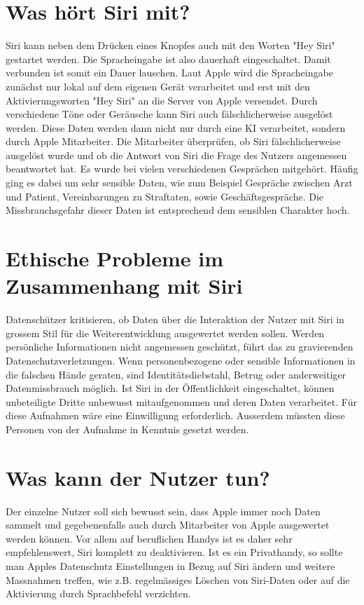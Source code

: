 \documentclass{article}
\begin{document}
\section{Was hört Siri mit?}
Siri kann neben dem Drücken eines Knopfes auch mit den Worten "Hey Siri" gestartet werden. Die Spracheingabe ist also dauerhaft eingeschaltet. Damit verbunden ist somit ein Dauer lauschen. Laut Apple wird die Spracheingabe zunächst nur lokal auf dem eigenen Gerät verarbeitet und erst mit den Aktivierungsworten "Hey Siri" an die Server von Apple versendet. Durch verschiedene Töne oder Geräusche kann Siri auch fälschlicherweise ausgelöst werden. Diese Daten werden dann nicht nur durch eine KI verarbeitet, sondern durch Apple Mitarbeiter. Die Mitarbeiter überprüfen, ob Siri fälschlicherweise ausgelöst wurde und ob die Antwort von Siri die Frage des Nutzers angemessen beantwortet hat.
Es wurde bei vielen verschiedenen Gesprächen mitgehört. Häufig ging es dabei um sehr sensible Daten, wie zum Beispiel Gespräche zwischen Arzt und Patient, Vereinbarungen zu Straftaten, sowie Geschäftsgespräche. Die Missbrauchsgefahr dieser Daten ist entsprechend dem sensiblen Charakter hoch. 


\section{Ethische Probleme im Zusammenhang mit Siri}
Datenschützer kritisieren, ob Daten über die Interaktion der Nutzer mit Siri in grossem Stil für die Weiterentwicklung ausgewertet werden sollen. Werden persönliche Informationen nicht angemessen geschützt, führt das zu gravierenden Datenschutzverletzungen. Wenn personenbezogene oder sensible Informationen in die falschen Hände geraten, sind Identitätsdiebstahl, Betrug oder anderweitiger Datenmissbrauch möglich. Ist Siri in der Öffentlichkeit eingeschaltet, können unbeteiligte Dritte unbewusst mitaufgenommen und deren Daten verarbeitet.
Für diese Aufnahmen wäre eine Einwilligung erforderlich. Ausserdem müssten diese Personen von der Aufnahme in Kenntnis gesetzt werden.

\section{Was kann der Nutzer tun?}
Der einzelne Nutzer soll sich bewusst sein, dass Apple immer noch Daten sammelt und gegebenenfalls auch durch Mitarbeiter von Apple ausgewertet werden können. Vor allem auf beruflichen Handys ist es daher sehr empfehlenswert, Siri komplett zu deaktivieren. Ist es ein Privathandy, so sollte man Apples Datenschutz Einstellungen in Bezug auf Siri ändern und weitere Massnahmen treffen, wie z.B. regelmässiges Löschen von Siri-Daten oder auf die Aktivierung durch Sprachbefehl verzichten. 
\end{document}
